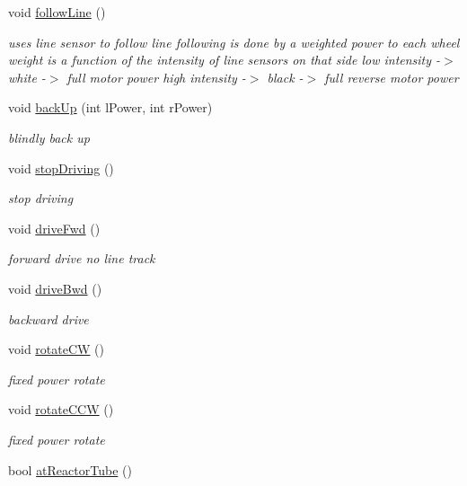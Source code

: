 \begin{DoxyCompactItemize}
void \hyperlink{classRobot_a6e3caf6e0346f6a54557eb57a79fc4f4}{follow\-Line} ()
\begin{DoxyCompactList}\small\item\em uses line sensor to follow line following is done by a weighted power to each wheel weight is a function of the intensity of line sensors on that side low intensity -\/$>$ white -\/$>$ full motor power high intensity -\/$>$ black -\/$>$ full reverse motor power \end{DoxyCompactList}\item 
void \hyperlink{classRobot_ace271ca13d78102450dbd929b4302560}{back\-Up} (int l\-Power, int r\-Power)
\begin{DoxyCompactList}\small\item\em blindly back up \end{DoxyCompactList}\item 
void \hyperlink{classRobot_a959f64b4829ade78bb332f205b50ee70}{stop\-Driving} ()
\begin{DoxyCompactList}\small\item\em stop driving \end{DoxyCompactList}\item 
void \hyperlink{classRobot_a35897f5e7b5c8b29cc6d386c6089abea}{drive\-Fwd} ()
\begin{DoxyCompactList}\small\item\em forward drive no line track \end{DoxyCompactList}\item 
void \hyperlink{classRobot_ac8d0a3e0308350bc1fc3a2a78be2aaca}{drive\-Bwd} ()
\begin{DoxyCompactList}\small\item\em backward drive \end{DoxyCompactList}\item 
void \hyperlink{classRobot_a9aa9c5a6f1b28861ffcee6ef1c1ed90d}{rotate\-C\-W} ()
\begin{DoxyCompactList}\small\item\em fixed power rotate \end{DoxyCompactList}\item 
void \hyperlink{classRobot_ac521de09b10ea0ee7f14171d54fee195}{rotate\-C\-C\-W} ()
\begin{DoxyCompactList}\small\item\em fixed power rotate \end{DoxyCompactList}\item 
bool \hyperlink{classRobot_a9183b1dd60c7d39bf6c8ecea5690b22c}{at\-Reactor\-Tube} ()

\end{DoxyCompactItemize}
